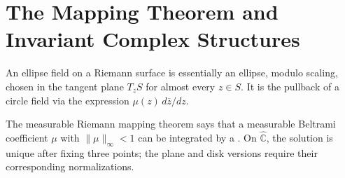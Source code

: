 \documentclass[11pt,a4paper]{article}
\begin{document}
\section*{The Mapping Theorem and Invariant Complex Structures}
An ellipse field on a Riemann surface is essentially an ellipse, modulo scaling, chosen in the tangent plane $T_zS$ for almost every $z\in S$. It is the pullback of a circle field via the expression $\mu(z)\,d\overline z/dz$.

The measurable Riemann mapping theorem says that a measurable Beltrami coefficient $\mu$ with $\|\mu\|_\infty<1$ can be integrated by a . On $\widehat{\mathbb C}$, the solution is unique after fixing three points; the plane and disk versions require their corresponding normalizations.\label{thm:measurable-riemann-mapping}
\end{document}
